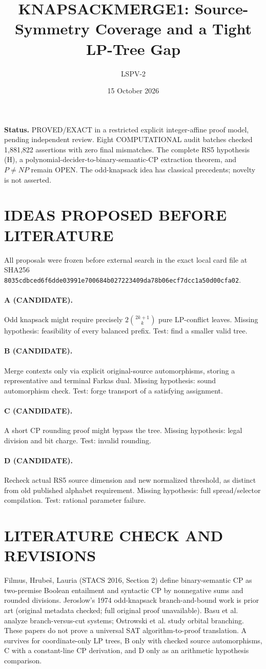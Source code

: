 \documentclass{article}
\title{KNAPSACKMERGE1: Source-Symmetry Coverage and a Tight LP-Tree Gap}
\author{LSPV-2}
\date{15 October 2026}
\begin{document}
\maketitle
\noindent\textbf{Status.} PROVED/EXACT in a restricted explicit integer-affine proof model, pending independent review. Eight COMPUTATIONAL audit batches checked 1,881,822 assertions with zero final mismatches. The complete RS5 hypothesis (H), a polynomial-decider-to-binary-semantic-CP extraction theorem, and $P\ne NP$ remain OPEN. The odd-knapsack idea has classical precedents; novelty is not asserted.

\section{IDEAS PROPOSED BEFORE LITERATURE}
All proposals were frozen before external search in the exact local card file at SHA256 \texttt{8035cdbced6f6dde03991e700684b027223409da78b06ecf7dcc1a50d00cfa02}.
\paragraph{A (CANDIDATE).} Odd knapsack might require precisely $2\binom{2k+1}{k}$ pure LP-conflict leaves. Missing hypothesis: feasibility of every balanced prefix. Test: find a smaller valid tree.
\paragraph{B (CANDIDATE).} Merge contexts only via explicit original-source automorphisms, storing a representative and terminal Farkas dual. Missing hypothesis: sound automorphism check. Test: forge transport of a satisfying assignment.
\paragraph{C (CANDIDATE).} A short CP rounding proof might bypass the tree. Missing hypothesis: legal division and bit charge. Test: invalid rounding.
\paragraph{D (CANDIDATE).} Recheck actual RS5 source dimension and new normalized threshold, as distinct from old published alphabet requirement. Missing hypothesis: full spread/selector compilation. Test: rational parameter failure.

\section{LITERATURE CHECK AND REVISIONS}
Filmus, Hrube\v{s}, Lauria (STACS 2016, Section 2) define binary-semantic CP as two-premise Boolean entailment and syntactic CP by nonnegative sums and rounded divisions. Jeroslow's 1974 odd-knapsack branch-and-bound work is prior art (original metadata checked; full original proof unavailable). Basu et al. analyze branch-versus-cut systems; Ostrowski et al. study orbital branching. These papers do not prove a universal SAT algorithm-to-proof translation. A survives for coordinate-only LP trees, B only with checked source automorphisms, C with a constant-line CP derivation, and D only as an arithmetic hypothesis comparison.
\end{document}
